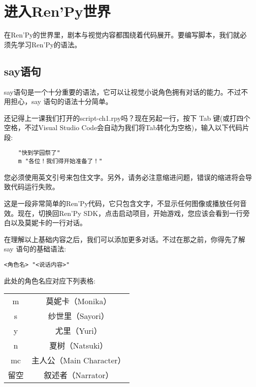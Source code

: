 \section{进入Ren'Py世界}
在Ren'Py的世界里，剧本与视觉内容都围绕着代码展开。要编写脚本，我们就必须先学习Ren'Py的语法。
\subsection{say语句}\label{subsec:3.2.1}
say语句是一个十分重要的语法，它可以让视觉小说角色拥有对话的能力。不过不用担心，say
语句的语法十分简单。

还记得上一课我们打开的script-ch1.rpy吗？现在另起一行，按下 Tab 键(或打四个空格，不过Visual Studio Code会自动为我们将Tab转化为空格)，输入以下代码片段:

\begin{lstlisting}
    "快到学园祭了"
    m "各位！我们得开始准备了！"
\end{lstlisting}

\begin{Warning}
您必须使用英文引号来包住文字。另外，请务必注意缩进问题，错误的缩进将会导致代码运行失败。
\end{Warning}

这是一段非常简单的Ren'Py代码，它只包含文字，不显示任何图像或播放任何音效。现在，切换回Ren'Py SDK，点击启动项目，开始游戏，您应该会看到一行旁白以及莫妮卡的一行对话。

在理解以上基础内容之后，我们可以添加更多对话。不过在那之前，你得先了解 say 语句的基础语法:

\begin{lstlisting}[numbers=none]
<角色名> "<说话内容>"
\end{lstlisting}


此处的角色名应对应下列表格:

\begin{center}
    \tabletail{\hline}
    \tablelasttail{\hline}
    \begin{supertabular}{|c|c|}
        \hline
        m & 莫妮卡（Monika）\\
        s & 纱世里（Sayori）\\
        y & 尤里（Yuri）\\
        n & 夏树（Natsuki）\\
        mc & 主人公（Main Character）\\
        留空 & 叙述者（Narrator）\\
        \hline
    \end{supertabular}
\end{center}

